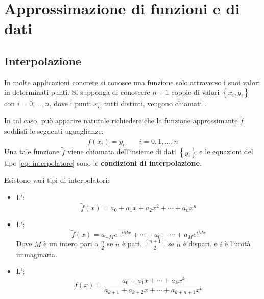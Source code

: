 \section{Approssimazione di funzioni e di dati}

\subsection{Interpolazione}

In molte applicazioni concrete si conosce una funzione solo attraverso i suoi valori in determinati punti. Si supponga di conoscere $n+1$ coppie di valori $\left\{x_{i}, y_{i}\right\}$ con $i = 0, \dots, n$, dove i punti $x_{i}$, tutti distinti, vengono chiamati .

\highspace
In tal caso, può apparire naturale richiedere che la funzione approssimante $\tilde{f}$ soddisfi le seguenti uguaglianze:
\begin{equation}\label{eq: interpolatore}
	\tilde{f}\left(x_{i}\right) = y_{i} \hspace{2em} i = 0, 1, \dots, n
\end{equation}
Una tale funzione $\tilde{f}$ viene chiamata  dell'insieme di dati $\left\{y_{i}\right\}$ e le equazioni del tipo \ref{eq: interpolatore} sono le \textbf{condizioni di interpolazione}.

\highspace
Esistono vari tipi di interpolatori:
\begin{itemize}
	\item L':
	\begin{equation*}
		\tilde{f}\left(x\right) = a_{0} + a_{1}x + a_{2}x^{2} + \cdots + a_{n}x^{n}
	\end{equation*}
	
	\item L':
	\begin{equation*}
		\tilde{f}\left(x\right) = a_{-M} e^{-i M x} + \cdots + a_{0} + \cdots + a_{M} e^{i M x}
	\end{equation*}
	Dove $M$ è un intero pari a $\frac{n}{2}$ se $n$ è pari, $\frac{\left(n+1\right)}{2}$ se $n$ è dispari, e $i$ è l'unità immaginaria.
	
	\item L':
	\begin{equation*}
		\tilde{f}\left(x\right) = \dfrac{
			a_{0} + a_{1}x + \cdots + a_{k}x^{k}
		}{
			a_{k+1} + a_{k+2}x + \cdots + a_{k+n+1} x^{n}
		}
	\end{equation*}
\end{itemize}